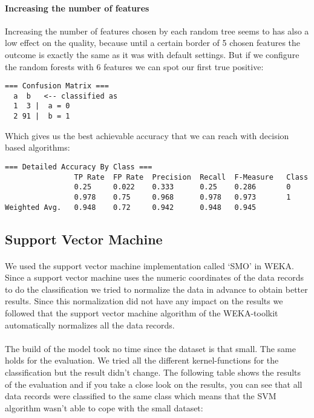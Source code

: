 \documentclass[paper=a4, fontsize=11pt]{scrartcl} %
\numberwithin{equation}{section} %
\numberwithin{figure}{section} %
\numberwithin{table}{section} %
\begin{document}
\paragraph{Increasing the number of features}
Increasing the number of features chosen by each random tree seems to has also a low effect on the quality, because until a certain border of 5 chosen features the outcome is exactly the same as it was with default settings. But if we configure the random forests with 6 features we can spot our first true positive:
\begin{lstlisting}
=== Confusion Matrix ===
  a  b   <-- classified as
  1  3 |  a = 0
  2 91 |  b = 1
\end{lstlisting}
Which gives us the best achievable accuracy that we can reach with decision based algorithms:
\begin{lstlisting}
=== Detailed Accuracy By Class ===
                TP Rate  FP Rate  Precision  Recall  F-Measure   Class
                0.25     0.022    0.333      0.25    0.286       0
                0.978    0.75     0.968      0.978   0.973       1
Weighted Avg.   0.948    0.72     0.942      0.948   0.945      
\end{lstlisting}

\subsection{Support Vector Machine}

\paragraph{}We used the support vector machine implementation called `SMO' in WEKA. Since a support vector machine uses the numeric coordinates of the data records to do the classification we tried to normalize the data in advance to obtain better results. Since this normalization did not have any impact on the results we followed that the support vector machine algorithm of the WEKA-toolkit automatically normalizes all the data records.

\paragraph{}The build of the model took no time since the dataset is that small. The same holds for the evaluation. We tried all the different kernel-functions for the classification but the result didn't change. The following table shows the results of the evaluation and if you take a close look on the results, you can see that all data records were classified to the same class which means that the SVM algorithm wasn't able to cope with the small dataset:
\end{document}
